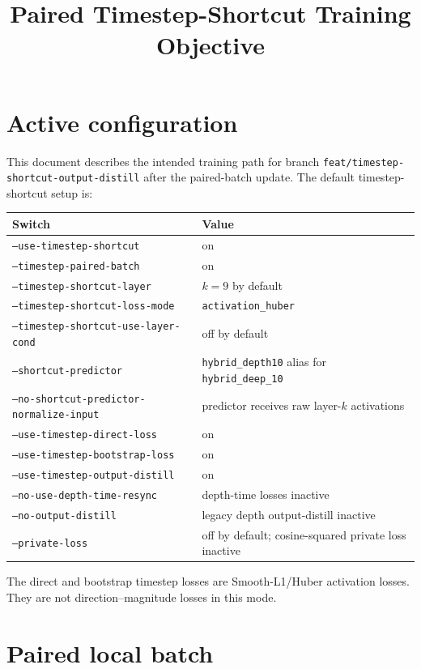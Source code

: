 \documentclass[11pt]{article}
\title{Paired Timestep-Shortcut Training Objective}
\author{}
\date{}
\begin{document}
\maketitle

\section{Active configuration}

This document describes the intended training path for branch
\texttt{feat/timestep-shortcut-output-distill} after the paired-batch update.
The default timestep-shortcut setup is:
\begin{center}
\begin{tabular}{ll}
\toprule
Switch & Value \\
\midrule
\texttt{--use-timestep-shortcut} & on \\
\texttt{--timestep-paired-batch} & on \\
\texttt{--timestep-shortcut-layer} & $k=9$ by default \\
\texttt{--timestep-shortcut-loss-mode} & \texttt{activation\_huber} \\
\texttt{--timestep-shortcut-use-layer-cond} & off by default \\
\texttt{--shortcut-predictor} & \texttt{hybrid\_depth10} alias for \texttt{hybrid\_deep\_10} \\
\texttt{--no-shortcut-predictor-normalize-input} & predictor receives raw layer-$k$ activations \\
\texttt{--use-timestep-direct-loss} & on \\
\texttt{--use-timestep-bootstrap-loss} & on \\
\texttt{--use-timestep-output-distill} & on \\
\texttt{--no-use-depth-time-resync} & depth-time losses inactive \\
\texttt{--no-output-distill} & legacy depth output-distill inactive \\
\texttt{--private-loss} & off by default; cosine-squared private loss inactive \\
\bottomrule
\end{tabular}
\end{center}

The direct and bootstrap timestep losses are Smooth-L1/Huber activation losses.
They are not direction--magnitude losses in this mode.

\section{Paired local batch}
\end{document}
